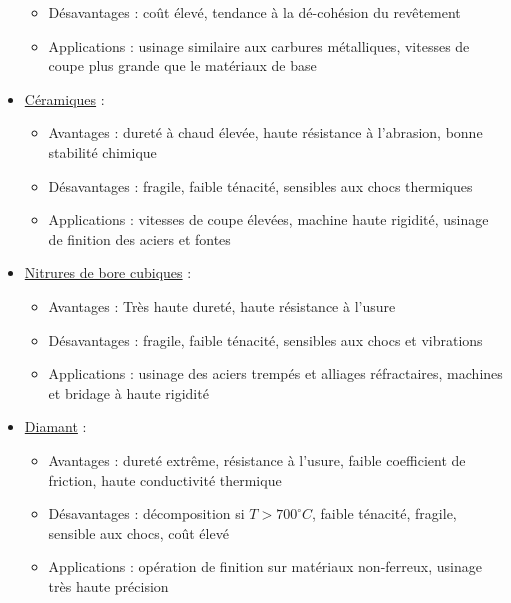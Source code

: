 \documentclass[../main.tex]{subfiles}
\begin{document}
\begin{itemize}
\begin{itemize}
        \item  Désavantages : coût élevé, tendance à la dé-cohésion du revêtement\\
        \item Applications : usinage similaire aux carbures métalliques, vitesses de coupe plus grande que le matériaux de base\\
    \end{itemize}
            \item \underline{Céramiques} :\begin{itemize}
        \item Avantages : dureté à chaud élevée, haute résistance à l'abrasion, bonne stabilité chimique\\
        \item  Désavantages : fragile, faible ténacité, sensibles aux chocs thermiques\\
        \item Applications : vitesses de coupe élevées, machine haute rigidité, usinage de finition des aciers et fontes\\
    \end{itemize}
            \item \underline{Nitrures de bore cubiques} :\begin{itemize}
        \item Avantages : Très haute dureté, haute résistance à l'usure\\
        \item  Désavantages : fragile, faible ténacité, sensibles aux chocs et vibrations\\
        \item Applications : usinage des aciers trempés et alliages réfractaires, machines et bridage à haute rigidité\\
    \end{itemize}
            \item \underline{Diamant} :\begin{itemize}
        \item Avantages : dureté extrême, résistance à l'usure, faible coefficient de friction, haute conductivité thermique\\
        \item  Désavantages : décomposition si $T>700^\circ C$, faible ténacité, fragile, sensible aux chocs, coût élevé\\
        \item Applications : opération de finition sur matériaux non-ferreux, usinage très haute précision\\
    \end{itemize}
\end{itemize}
\end{document}

